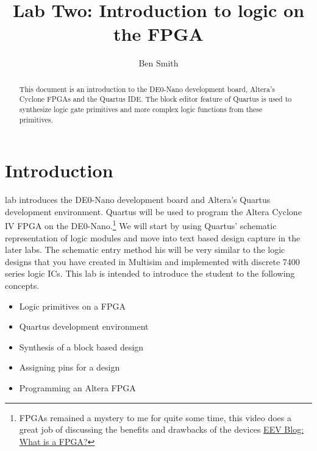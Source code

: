 \newcommand{\KEYWORDS}{Logic Gates, Verilog, FPGA, Signaltap, Synthesis}




\title{Lab Two: Introduction to logic on the FPGA}
\author{Ben Smith}
\maketitle

  \begin{abstract}
    This document is an introduction to the DE0-Nano development board, Altera's Cyclone FPGAs and the Quartus IDE. The block editor feature of Quartus is used to synthesize logic gate primitives and more complex logic functions from these primitives.
  \end{abstract}

  \section{Introduction}
     lab introduces the DE0-Nano development board and Altera's Quartus development environment. Quartus will be used to program the Altera Cyclone IV FPGA on the DE0-Nano.\footnote{FPGAs remained a mystery to me for quite some time, this video does a great job of discussing the benefits and drawbacks of the devices \href{https://www.youtube.com/watch?v=gUsHwi4M4xE}{EEV Blog: What is a FPGA?}} We will start by using Quartus' schematic representation of logic modules and move into text based design capture in the later labs. The schematic entry method his will be very similar to the logic designs that you have created in Multisim and implemented with discrete 7400 series logic ICs. This lab is intended to introduce the student to the following concepts.
    \begin{itemize}
       \item Logic primitives on a FPGA
       \item Quartus development environment
       \item Synthesis of a block based design
       \item Assigning pins for a design
       \item Programming an Altera FPGA
    \end{itemize}

